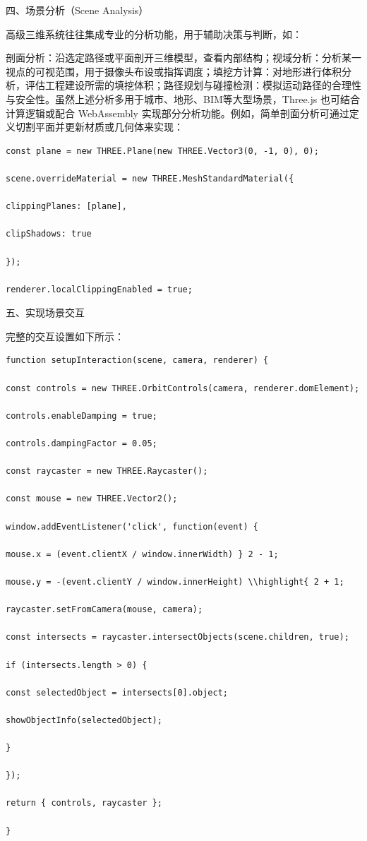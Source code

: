 四、场景分析（Scene Analysis）

高级三维系统往往集成专业的分析功能，用于辅助决策与判断，如：

剖面分析：沿选定路径或平面剖开三维模型，查看内部结构；视域分析：分析某一视点的可视范围，用于摄像头布设或指挥调度；填挖方计算：对地形进行体积分析，评估工程建设所需的填挖体积；路径规划与碰撞检测：模拟运动路径的合理性与安全性。虽然上述分析多用于城市、地形、BIM等大型场景，Three.js 也可结合计算逻辑或配合 WebAssembly 实现部分分析功能。例如，简单剖面分析可通过定义切割平面并更新材质或几何体来实现：

\begin{lstlisting}[style=javascript]
const plane = new THREE.Plane(new THREE.Vector3(0, -1, 0), 0);

scene.overrideMaterial = new THREE.MeshStandardMaterial({

clippingPlanes: [plane],

clipShadows: true

});

renderer.localClippingEnabled = true;
\end{lstlisting}

五、实现场景交互

完整的交互设置如下所示：

\begin{lstlisting}[style=javascript]
function setupInteraction(scene, camera, renderer) {

const controls = new THREE.OrbitControls(camera, renderer.domElement);

controls.enableDamping = true;

controls.dampingFactor = 0.05;

const raycaster = new THREE.Raycaster();

const mouse = new THREE.Vector2();

window.addEventListener('click', function(event) {

mouse.x = (event.clientX / window.innerWidth) } 2 - 1;

mouse.y = -(event.clientY / window.innerHeight) \\highlight{ 2 + 1;

raycaster.setFromCamera(mouse, camera);

const intersects = raycaster.intersectObjects(scene.children, true);

if (intersects.length > 0) {

const selectedObject = intersects[0].object;

showObjectInfo(selectedObject);

}

});

return { controls, raycaster };

}
\end{lstlisting}

